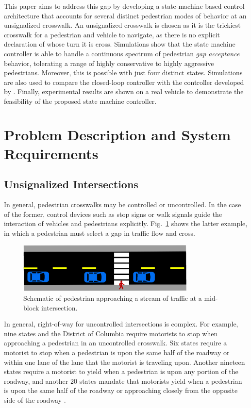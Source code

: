 \documentclass[letterpaper, 10 pt, conference]{ieeeconf}  %
\begin{document}
This paper aims to address this gap by developing a state-machine based control architecture that accounts for several distinct pedestrian modes of behavior at an unsignalized crosswalk. An unsignalized crosswalk is chosen as it is the trickiest crosswalk for a pedestrian and vehicle to navigate, as there is no explicit declaration of whose turn it is cross. Simulations show that the state machine controller is able to handle a continuous spectrum of pedestrian \textit{gap acceptance} behavior, tolerating a range of highly conservative to highly aggressive pedestrians. Moreover, this is possible with just four distinct states. Simulations are also used to compare the closed-loop controller with the controller developed by \cite{Thornton2018}. Finally, experimental results are shown on a real vehicle to demonstrate the feasibility of the proposed state machine controller. 


\section{Problem Description and System Requirements}

\subsection{Unsignalized Intersections}

In general, pedestrian crosswalks may be controlled or uncontrolled. In the case of the former, control devices such as stop signs or walk signals guide the interaction of vehicles and pedestrians explicitly. Fig.~\ref{fig:schematic} shows the latter example, in which a pedestrian must select a gap in traffic flow and cross.   

\begin{figure}
\centering
\includegraphics[width=3.5in]{figures/example.eps}
\caption{Schematic of pedestrian approaching a stream of traffic at a mid-block intersection.}
\label{fig:schematic}
\end{figure}

In general, right-of-way for uncontrolled intersections is complex. For example, nine states and the District of Columbia require motorists to stop when approaching a pedestrian in an uncontrolled crosswalk. Six states require a motorist to stop when a pedestrian is upon the same half of the roadway or within one lane of the lane that the motorist is traveling upon. Another nineteen states require a motorist to yield when a pedestrian is upon any portion of the roadway, and another 20 states mandate that motorists yield when a pedestrian is upon the same half of the roadway or approaching closely from the opposite side of the roadway \cite{NCSL}.
\end{document}
